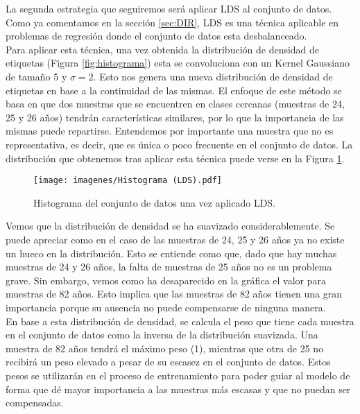 La segunda estrategia que seguiremos será aplicar LDS al conjunto de datos. Como ya comentamos en la sección \ref{sec:DIR}, LDS es una técnica aplicable en problemas de regresión donde el conjunto de datos esta desbalanceado.\\

Para aplicar esta técnica, una vez obtenida la distribución de densidad de etiquetas (Figura \ref{fig:histograma}) esta se convoluciona con un Kernel Gaussiano de tamaño 5 y $\sigma=2$. Esto nos genera una nueva distribución de densidad de etiquetas en base a la continuidad de las mismas. 
El enfoque de este método se basa en que dos muestras que se encuentren en clases cercanas (muestras de 24, 25 y 26 años) tendrán características similares, por lo que la importancia de las mismas puede repartirse. Entendemos por importante una muestra que no es representativa, es decir, que es única o poco frecuente en el conjunto de datos. La distribución que obtenemos tras aplicar esta técnica puede verse en la Figura \ref{fig:histogramalds}.

\begin{figure}[ht]
    \centering
    \texttt{[image: imagenes/Histograma (LDS).pdf]}
    \caption{Histograma del conjunto de datos una vez aplicado LDS.}
    \label{fig:histogramalds}
\end{figure}

Vemos que la distribución de densidad se ha suavizado considerablemente. Se puede apreciar como en el caso de las muestras de 24, 25 y 26 años ya no existe un hueco en la distribución. Esto se entiende como que, dado que hay muchas muestras de 24 y 26 años, la falta de muestras de 25 años no es un problema grave. Sin embargo, vemos como ha desaparecido en la gráfica el valor para muestras de 82 años. Esto implica que las muestras de 82 años tienen una gran importancia porque su ausencia no puede compensarse de ninguna manera.\\

En base a esta distribución de densidad, se calcula el peso que tiene cada muestra en el conjunto de datos como la inversa de la distribución suavizada. Una muestra de 82 años tendrá el máximo peso (1), mientras que otra de 25 no recibirá un peso elevado a pesar de su escasez en el conjunto de datos. Estos pesos se utilizarán en el proceso de entrenamiento para poder guiar al modelo de forma que dé mayor importancia a las muestras más escasas y que no puedan ser compensadas.


